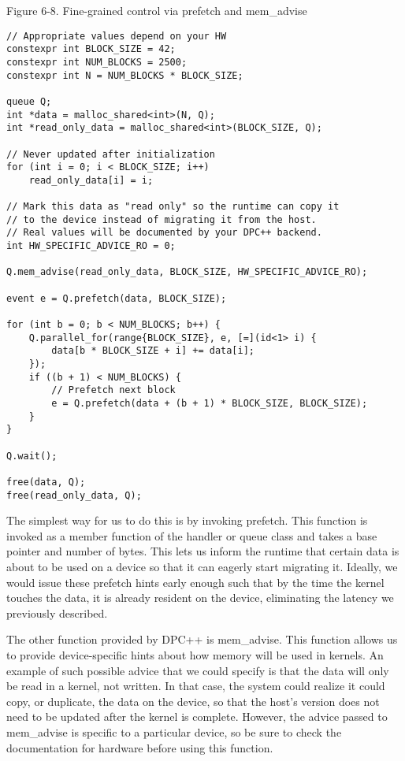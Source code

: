 \hspace*{\fill} \par %
Figure 6-8. Fine-grained control via prefetch and mem\_advise
\begin{lstlisting}[caption={}]
// Appropriate values depend on your HW
constexpr int BLOCK_SIZE = 42;
constexpr int NUM_BLOCKS = 2500;
constexpr int N = NUM_BLOCKS * BLOCK_SIZE;

queue Q;
int *data = malloc_shared<int>(N, Q);
int *read_only_data = malloc_shared<int>(BLOCK_SIZE, Q);

// Never updated after initialization
for (int i = 0; i < BLOCK_SIZE; i++)
	read_only_data[i] = i;
	
// Mark this data as "read only" so the runtime can copy it
// to the device instead of migrating it from the host.
// Real values will be documented by your DPC++ backend.
int HW_SPECIFIC_ADVICE_RO = 0;

Q.mem_advise(read_only_data, BLOCK_SIZE, HW_SPECIFIC_ADVICE_RO);

event e = Q.prefetch(data, BLOCK_SIZE);

for (int b = 0; b < NUM_BLOCKS; b++) {
	Q.parallel_for(range{BLOCK_SIZE}, e, [=](id<1> i) {
		data[b * BLOCK_SIZE + i] += data[i];
	});
	if ((b + 1) < NUM_BLOCKS) {
		// Prefetch next block
		e = Q.prefetch(data + (b + 1) * BLOCK_SIZE, BLOCK_SIZE);
	}
}

Q.wait();

free(data, Q);
free(read_only_data, Q);
\end{lstlisting}

The simplest way for us to do this is by invoking prefetch. This function is invoked as a member function of the handler or queue class and takes a base pointer and number of bytes. This lets us inform the runtime that certain data is about to be used on a device so that it can eagerly start migrating it. Ideally, we would issue these prefetch hints early enough such that by the time the kernel touches the data, it is already resident on the device, eliminating the latency we previously described.\par

The other function provided by DPC++ is mem\_advise. This function allows us to provide device-specific hints about how memory will be used in kernels. An example of such possible advice that we could specify is that the data will only be read in a kernel, not written. In that case, the system could realize it could copy, or duplicate, the data on the device, so that the host’s version does not need to be updated after the kernel is complete. However, the advice passed to mem\_advise is specific to a particular device, so be sure to check the documentation for hardware before using this function.\par
















